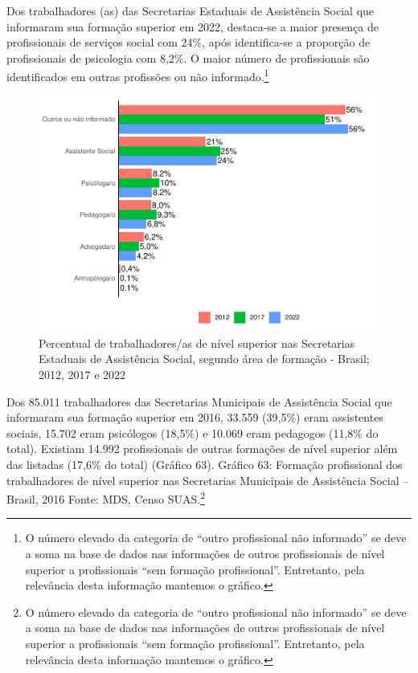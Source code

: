 \documentclass[
  brazilian]{report}
\begin{document}
Dos trabalhadores (as) das Secretarias Estaduais de Assistência Social
que informaram sua formação superior em 2022, destaca-se a maior
presença de profissionais de serviços social com 24\%, após
identifica-se a proporção de profissionais de psicologia com 8,2\%. O
maior número de profissionais são identificados em outras profissões ou
não
informado.\footnote{O número elevado da categoria de “outro profissional não informado” se deve a soma na base de dados nas informações de outros profissionais de nível superior a profissionais “sem formação profissional”. Entretanto, pela relevância desta informação mantemos o gráfico.}

\begin{figure}
\includegraphics{Censo-SUAS-2022_files/figure-latex/uf_trab_prof-1} \caption[Percentual de trabalhadores/as de nível superior nas Secretarias Estaduais de Assistência Social, segundo área de formação - Brasil]{Percentual de trabalhadores/as de nível superior nas Secretarias Estaduais de Assistência Social, segundo área de formação - Brasil; 2012, 2017 e 2022}\label{fig:uf_trab_prof}
\end{figure}

Dos 85.011 trabalhadores das Secretarias Municipais de Assistência
Social que informaram sua formação superior em 2016, 33.559 (39,5\%)
eram assistentes sociais, 15.702 eram psicólogos (18,5\%) e 10.069 eram
pedagogos (11,8\% do total). Existiam 14.992 profissionais de outras
formações de nível superior além das listadas (17,6\% do total) (Gráfico
63). Gráfico 63: Formação profissional dos trabalhadores de nível
superior nas Secretarias Municipais de Assistência Social -- Brasil,
2016 Fonte: MDS, Censo
SUAS.\footnote{O número elevado da categoria de “outro profissional não informado” se deve a soma na base de dados nas informações de outros profissionais de nível superior a profissionais “sem formação profissional”. Entretanto, pela relevância desta informação mantemos o gráfico.}
\end{document}
